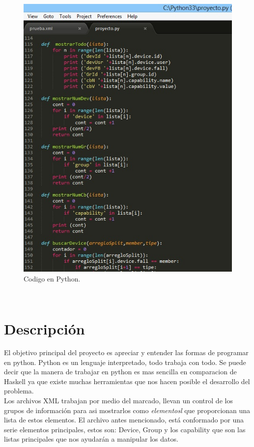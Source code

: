 \documentclass[12pt]{book} %
\begin{document}
\begin{figure}[h!]
        \begin{center}
        \includegraphics[scale=0.8]{pyex.jpg}
        \end{center}
        \caption{Codigo en Python.}
\end{figure}~\\[2cm]

\chapter{Descripci\'on}
El objetivo principal del proyecto es apreciar y entender las formas de programar en python.
Python es un lenguaje interpretado, todo trabaja con todo. Se puede decir que la manera de trabajar en python es mas sencilla en comparacion de Haskell ya que existe muchas herramientas que nos hacen posible el desarrollo del problema.~\\[0.5cm]

Los archivos XML trabajan por medio del marcado, llevan un control de los grupos de informaci\'on para asi mostrarlos como \textit{elementosl} que proporcionan una lista de estos elementos. El archivo antes mencionado, est\'a conformado por una serie elementos principales, estos son: Device, Group y los capability que son las listas principales que nos ayudar\'an a manipular los datos.~\\[0.5cm]
\end{document}

